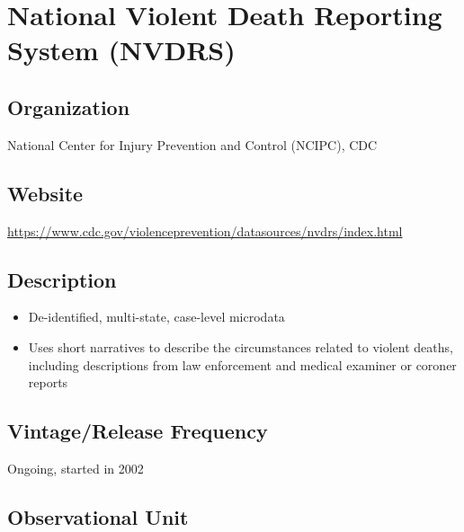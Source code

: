 \documentclass[
]{book}
\providecommand{\tightlist}{%
  \setlength{\itemsep}{0pt}\setlength{\parskip}{0pt}}
\begin{document}
\mainmatter

\hypertarget{national-violent-death-reporting-system-nvdrs}{%
\chapter{National Violent Death Reporting System (NVDRS)}\label{national-violent-death-reporting-system-nvdrs}}

\hypertarget{organization-65}{%
\section{Organization}\label{organization-65}}

National Center for Injury Prevention and Control (NCIPC), CDC

\hypertarget{website-65}{%
\section{Website}\label{website-65}}

\url{https://www.cdc.gov/violenceprevention/datasources/nvdrs/index.html}

\hypertarget{description-65}{%
\section{Description}\label{description-65}}

\begin{itemize}
\tightlist
\item
  De-identified, multi-state, case-level microdata
\item
  Uses short narratives to describe the circumstances related to violent deaths, including descriptions from law enforcement and medical examiner or coroner reports
\end{itemize}

\hypertarget{vintagerelease-frequency-65}{%
\section{Vintage/Release Frequency}\label{vintagerelease-frequency-65}}

Ongoing, started in 2002

\hypertarget{observational-unit-65}{%
\section{Observational Unit}\label{observational-unit-65}}
\end{document}
